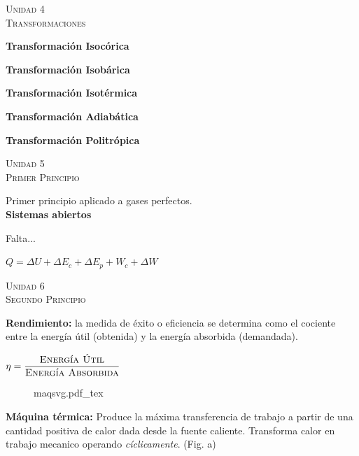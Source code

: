 \documentclass[11pt,a4paper,twocolumn]{article}
\newcommand{\unidad}[2]{\begin{center}
		\fontsize{10}{10}\selectfont\color{gray!50!black}\scshape Unidad #1 \\
		\fontsize{14}{14}\selectfont \scshape #2
\end{center}}
\begin{document}
	
	\unidad{4}{Transformaciones}
	
	\textbf{Transformación Isocórica}
		
	\textbf{Transformación Isobárica}
	
	\textbf{Transformación Isotérmica}
	
	\textbf{Transformación Adiabática}
	
	\textbf{Transformación Politrópica}

	
	\unidad{5}{Primer Principio}
	
	Primer principio aplicado a gases perfectos.\\
	
	\textbf{Sistemas abiertos}
	
	Falta...
	
	\begin{center}
		$Q=\Delta U + \Delta E_{c} + \Delta E_{p} + W_c + \Delta W$
	\end{center}
	
	
	\unidad{6}{Segundo Principio}
	
	\textbf{Rendimiento:} la medida de éxito o eficiencia se determina como el cociente entre la energía útil (obtenida) y la energía absorbida (demandada).\begin{center}
		$\eta = \dfrac{\textsc{Energía Útil}}{\textsc{Energía Absorbida}}$
	\end{center}
	\begin{figure}[ht]
		\centering
		\def\svgwidth{0.4\textwidth}
		{maqsvg.pdf_tex}
	\end{figure}
	
%	
	\textbf{Máquina térmica:}
	Produce la máxima transferencia de trabajo a partir de una cantidad positiva de calor dada desde la fuente caliente. Transforma calor en trabajo mecanico operando \emph{cíclicamente}. (Fig. a)
	
\end{document}
